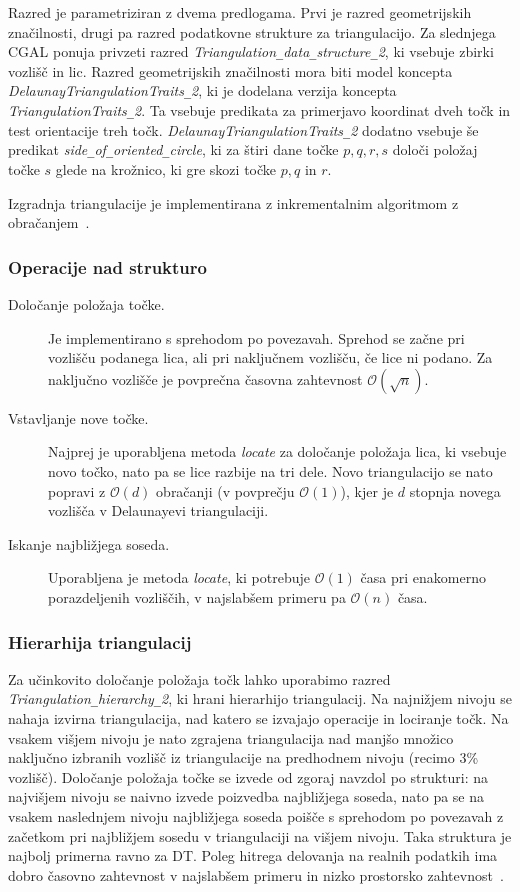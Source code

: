 \documentclass[a4paper, 12pt]{book}
\newcommand{\OO}{\ensuremath{\mathcal{O}}} %
\newcommand{\U}{\texttt{\_}}
\begin{document}
Razred je parametriziran z dvema predlogama. Prvi je razred geometrijskih značilnosti, drugi pa razred podatkovne strukture za triangulacijo. Za slednjega CGAL ponuja privzeti razred \textit{ Triangulation\U data\U structure\U 2}, ki vsebuje zbirki vozlišč in lic. Razred geometrijskih značilnosti mora biti model koncepta \textit{DelaunayTriangulationTraits\U 2}, ki je dodelana verzija koncepta \textit{TriangulationTraits\U 2}. Ta vsebuje predikata za primerjavo koordinat dveh točk in test orientacije treh točk. \textit{DelaunayTriangulationTraits\U 2} dodatno vsebuje še predikat \textit{side\U of\U oriented\U circle}, ki za štiri dane točke $p, q, r, s$ določi položaj točke $s$ glede na krožnico, ki gre skozi točke $p, q$ in $r$.

Izgradnja triangulacije je implementirana z inkrementalnim algoritmom z obračanjem~\cite{cgal:y-t2-16b}.

\subsubsection{Operacije nad strukturo}
\begin{description}
\item[Določanje položaja točke.] Je implementirano s sprehodom po povezavah. Sprehod se začne pri vozlišču podanega lica, ali pri naključnem vozlišču, če lice ni podano. Za naključno vozlišče je povprečna časovna zahtevnost $\OO(\sqrt{n})$.
\item[Vstavljanje nove točke.] Najprej je uporabljena metoda \textit{locate} za določanje položaja lica, ki vsebuje novo točko, nato pa se lice razbije na tri dele. Novo triangulacijo se nato popravi z $\OO(d)$ obračanji (v povprečju $\OO(1)$), kjer je $d$ stopnja novega vozlišča v Delaunayevi triangulaciji.
\item[Iskanje najbližjega soseda.] Uporabljena je metoda \textit{locate}, ki potrebuje $\OO(1)$ časa pri enakomerno porazdeljenih vozliščih, v najslabšem primeru pa $\OO(n)$ časa.
\end{description}

\subsubsection{Hierarhija triangulacij}
Za učinkovito določanje položaja točk lahko uporabimo razred \textit{Trian\-gu\-la\-tion\U hier\-archy\U 2}, ki hrani hierarhijo triangulacij. Na najnižjem nivoju se nahaja izvirna triangulacija, nad katero se izvajajo operacije in lociranje točk. Na vsakem višjem nivoju je nato zgrajena triangulacija nad manjšo množico naključno izbranih vozlišč iz triangulacije na predhodnem nivoju (recimo 3\% vozlišč). Določanje položaja točke se izvede od zgoraj navzdol po strukturi: na najvišjem nivoju se naivno izvede poizvedba najbližjega soseda, nato pa se na vsakem naslednjem nivoju najbližjega soseda poišče s sprehodom po povezavah z začetkom pri najbližjem sosedu v triangulaciji na višjem nivoju. Taka struktura je najbolj primerna ravno za DT. Poleg hitrega delovanja na realnih podatkih ima dobro časovno zahtevnost v najslabšem primeru in nizko prostorsko zahtevnost~\cite{Olivier}.
\end{document}
